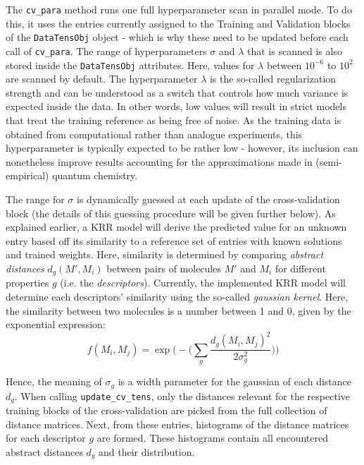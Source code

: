 \documentclass[12pt]{achemso}
\begin{document}
\noindent The \verb+cv_para+ method runs one full hyperparameter scan in parallel mode. To do this, it uses the entries currently assigned to the Training and Validation blocks of the \verb+DataTensObj+ object - which is why these need to be updated before each call of \verb+cv_para+. The range of hyperparameters $\sigma$ and $\lambda$ that is scanned is also stored inside the \verb+DataTensObj+ attributes. Here, values for $\lambda$ between $10^{-6}$ to $10^{2}$ are scanned by default. The hyperparameter $\lambda$ is the so-called regularization strength and can be understood as a switch that controls how much variance is expected inside the data. In other words, low values will result in strict models that treat the training reference as being free of noise. As the training data is obtained from computational rather than analogue experiments, this hyperparameter is typically expected to be rather low - however, its inclusion can nonetheless improve results accounting for the approximations made in (semi-empirical) quantum chemistry.

\noindent The range for $\sigma$ is dynamically guessed at each update of the cross-validation block (the details of this guessing procedure will be given further below). As explained earlier, a KRR model will derive the predicted value for an unknown entry based off its similarity to a reference set of entries with known solutions and trained weights. Here, similarity is determined by comparing \textit{abstract distances} $d_g (M', M_i)$ between pairs of molecules $M'$ and $M_i$ for different properties $g$ (i.e. the \textit{descriptors}). Currently, the implemented KRR model will determine each descriptors' similarity using the so-called \textit{gaussian kernel}. Here, the similarity between two molecules is a number between 1 and 0, given by the exponential expression:\\[-3em]

\begin{equation*}
    f(M_i, M_j) = \exp \Bigg(-\Bigg( \sum\limits_{g}\frac{d_g(M_i, M_j)^2}{2 \sigma_g^2}\Bigg)\Bigg)
\end{equation*}

\noindent Hence, the meaning of $\sigma_g$ is a width parameter for the gaussian of each distance $d_g$. When calling \texttt{update\_cv\_tens}, only the distances relevant for the respective training blocks of the cross-validation are picked from the full collection of distance matrices. Next, from these entries, histograms of the distance matrices for each descriptor $g$ are formed. These histograms contain all encountered abstract distances $d_g$ and their distribution.
\end{document}
